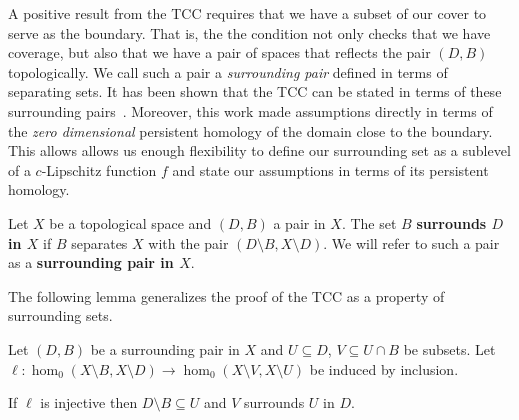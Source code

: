 

A positive result from the TCC requires that we have a subset of our cover to serve as the boundary.
That is, the the condition not only checks that we have coverage, but also that we have a pair of spaces that reflects the pair $(D, B)$ topologically.
We call such a pair a \emph{surrounding pair} defined in terms of separating sets.
It has been shown that the TCC can be stated in terms of these surrounding pairs~\cite{cavanna2017when}.
Moreover, this work made assumptions directly in terms of the \emph{zero dimensional} persistent homology of the domain close to the boundary.
This allows allows us enough flexibility to define our surrounding set as a sublevel of a $c$-Lipschitz function $f$ and state our assumptions in terms of its persistent homology.

\begin{definition}
  Let $X$ be a topological space and $(D,B)$ a pair in $X$.
  The set $B$ \textbf{surrounds $D$ in $X$} if $B$ separates $X$ with the pair $(D\setminus B, X\setminus D)$.
  We will refer to such a pair as a \textbf{surrounding pair in $X$}.
\end{definition}

The following lemma generalizes the proof of the TCC as a property of surrounding sets.%

\begin{lemma}\label{lem:coverage}
  Let $(D, B)$ be a surrounding pair in $X$ and $U\subseteq D$, $V\subseteq U\cap B$ be subsets.
  Let $\ell: \hom_0(X\setminus B, X\setminus D)\to \hom_0(X\setminus V, X\setminus U)$ be induced by inclusion.

  If $\ell$ is injective then $D\setminus B\subseteq U$ and $V$ surrounds $U$ in $D$.
\end{lemma}

